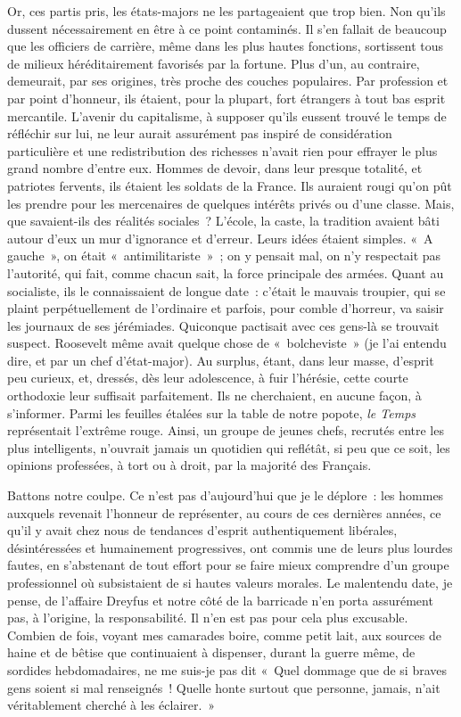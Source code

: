 \documentclass[french,twoside]{book} %
\begin{document}
Or, ces partis pris, les états-majors ne les partageaient que trop bien. Non qu’ils dussent nécessairement en être à ce point contaminés. Il s’en fallait de beaucoup que les officiers de carrière, même dans   les plus hautes fonctions, sortissent tous de milieux héréditairement favorisés par la fortune. Plus d’un, au contraire, demeurait, par ses origines, très proche des couches populaires. Par profession et par point d’honneur, ils étaient, pour la plupart, fort étrangers à tout bas esprit mercantile. L’avenir du capitalisme, à supposer qu’ils eussent trouvé le temps de réfléchir sur lui, ne leur aurait assurément pas inspiré de considération particulière et une redistribution des richesses n’avait rien pour effrayer le plus grand nombre d’entre eux. Hommes de devoir, dans leur presque totalité, et patriotes fervents, ils étaient les soldats de la France. Ils auraient rougi qu’on pût les prendre pour les mercenaires de quelques intérêts privés ou d’une classe. Mais, que savaient-ils des réalités sociales ? L’école, la caste, la tradition avaient bâti autour d’eux un mur d’ignorance et d’erreur. Leurs idées étaient simples. « A gauche », on était « antimilitariste » ; on y pensait mal, on n’y respectait pas l’autorité, qui fait, comme chacun sait, la force principale des armées. Quant au socialiste, ils le connaissaient de longue date : c’était le mauvais troupier, qui se plaint perpétuellement de l’ordinaire et parfois, pour comble d’horreur, va saisir les journaux de ses jérémiades. Quiconque pactisait avec ces gens-là se trouvait suspect. Roosevelt même avait quelque chose de « bolcheviste » (je l’ai entendu dire, et par un chef d’état-major). Au surplus, étant, dans leur masse, d’esprit peu curieux, et, dressés, dès leur adolescence, à fuir l’hérésie, cette courte orthodoxie leur suffisait parfaitement. Ils ne cherchaient, en aucune façon, à s’informer. Parmi les feuilles étalées sur la table de notre popote, \emph{le Temps} représentait l’extrême rouge. Ainsi, un groupe de jeunes chefs, recrutés entre les plus intelligents, n’ouvrait jamais un quotidien qui reflétât, si peu que ce soit, les opinions professées, à tort ou à droit, par la majorité des Français.\par
  Battons notre coulpe. Ce n’est pas d’aujourd’hui que je le déplore : les hommes auxquels revenait l’honneur de représenter, au cours de ces dernières années, ce qu’il y avait chez nous de tendances d’esprit authentiquement libérales, désintéressées et humainement progressives, ont commis une de leurs plus lourdes fautes, en s’abstenant de tout effort pour se faire mieux comprendre d’un groupe professionnel où subsistaient de si hautes valeurs morales. Le malentendu date, je pense, de l’affaire Dreyfus et notre côté de la barricade n’en porta assurément pas, à l’origine, la responsabilité. Il n’en est pas pour cela plus excusable. Combien de fois, voyant mes camarades boire, comme petit lait, aux sources de haine et de bêtise que continuaient à dispenser, durant la guerre même, de sordides hebdomadaires, ne me suis-je pas dit « Quel dommage que de si braves gens soient si mal renseignés ! Quelle honte surtout que personne, jamais, n’ait véritablement cherché à les éclairer. »\par
\end{document}
